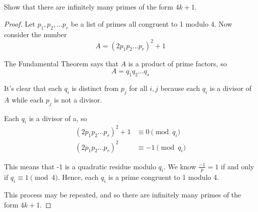 \section{}

Show that there are infinitely many primes of the form $4k+1$. 

\begin{proof}
Let $p_1, p_2, \ldots p_r$ be a list of primes all congruent to 1 modulo 4.
Now consider the number
\[ A = (2p_1 p_2 \ldots p_r)^2 + 1 \]

The Fundamental Theorem says that $A$ is a product of prime factors, so 
\[A = q_1 q_2 \ldots q_s \]

It's clear that each $q_i$ is distinct from $p_j$ for all $i,j$ because each
$q_i$ is a divisor of $A$ while each $p_j$ is not a divisor.

Each $q_i$ is a divisor of a, so 
\begin{align*}
	(2p_1 p_2 \ldots p_r)^2 + 1 &\equiv 0 \pmod{q_i} \\
	(2p_1 p_2 \ldots p_r)^2     &\equiv -1 \pmod{q_i}
\end{align*}

This means that -1 is a quadratic residue modulo $q_i$. We know $\frac{-1}{p} =
1$ if and only if $q_i \equiv 1 \pmod 4$. Hence, each $q_i$ is a prime congruent
to 1 modulo 4.

This process may be repeated, and so there are infinitely many primes of the
form $4k+1$.
\end{proof}